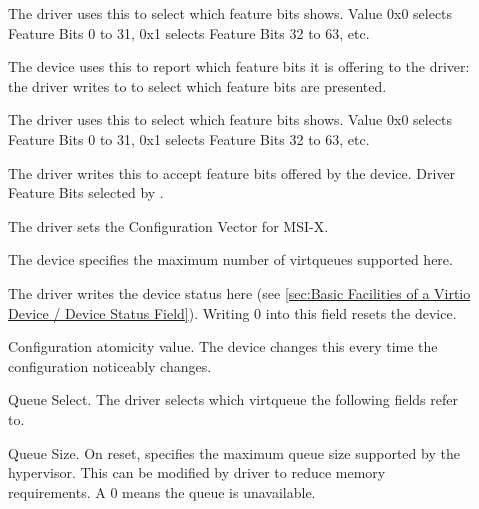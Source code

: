 \begin{description}
\item[]
        The driver uses this to select which feature bits  shows.
        Value 0x0 selects Feature Bits 0 to 31, 0x1 selects Feature Bits 32 to 63, etc.

\item[]
        The device uses this to report which feature bits it is
        offering to the driver: the driver writes to
         to select which feature bits are presented.

\item[]
        The driver uses this to select which feature bits  shows.
        Value 0x0 selects Feature Bits 0 to 31, 0x1 selects Feature Bits 32 to 63, etc.

\item[]
        The driver writes this to accept feature bits offered by the device.
        Driver Feature Bits selected by .

\item[]
        The driver sets the Configuration Vector for MSI-X.

\item[]
        The device specifies the maximum number of virtqueues supported here.

\item[]
        The driver writes the device status here (see \ref{sec:Basic Facilities of a Virtio Device / Device Status Field}). Writing 0 into this
        field resets the device.

\item[]
        Configuration atomicity value.  The device changes this every time the
        configuration noticeably changes.

\item[]
        Queue Select. The driver selects which virtqueue the following
        fields refer to.

\item[]
        Queue Size.  On reset, specifies the maximum queue size supported by
        the hypervisor. This can be modified by driver to reduce memory requirements.
        A 0 means the queue is unavailable.


\end{description}
